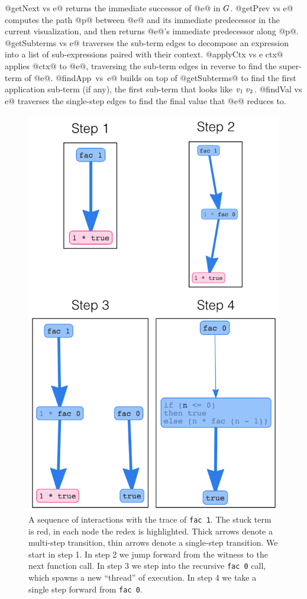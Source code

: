 @getNext vs e@ returns the immediate successor of @e@ in $G$.
%
@getPrev vs e@ computes the path @p@ between @e@ and its immediate
predecessor in the current visualization, and then returns @e@'s immediate
predecessor along @p@.
%
@getSubterms vs e@ traverses the sub-term edges to decompose an
expression into a list of sub-expressions paired with their context.
%
@applyCtx vs e ctx@ applies @ctx@ to @e@, traversing the sub-term edges
in reverse to find the super-term of @e@.
%
\hbox{@findApp vs e@} builds on top of @getSubterms@ to find the first
application sub-term (if any), \ie the first sub-term that looks like
$v_1 \ v_2$.
%
@findVal vs e@ traverses the single-step edges to find the final value
that @e@ reduces to.
%

\begin{figure}[t]
\centering
\includegraphics[width=0.8\linewidth]{fac-steps.png}
\caption{A sequence of interactions with the trace of
  \texttt{fac 1}. The stuck term is red, in each node the redex is
  highlighted. Thick arrows denote a multi-step transition, thin arrows
  denote a single-step transition. We start in step 1. In step 2 we jump
  forward from the witness to the next function call. In step 3 we step
  into the recursive \texttt{fac 0} call, which spawns a new ``thread''
  of execution. In step 4 we take a single step forward from
  \texttt{fac 0}.} %
\label{fig:nanomaly-factorial}
\end{figure}

%
%
%
